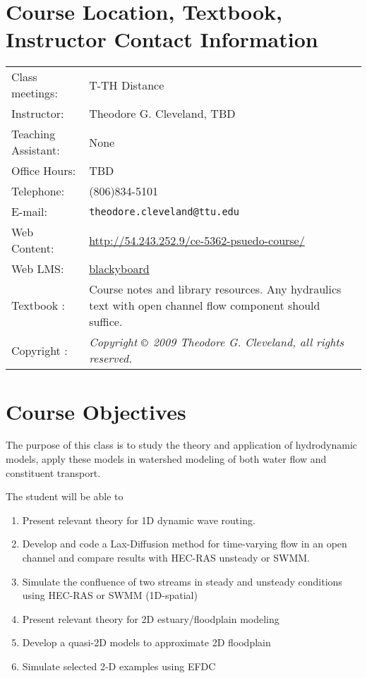 \documentclass[12pt]{article}
\begin{document}
\begin{center}
\end{center}


\section*{\small{Course Location, Textbook, Instructor Contact Information}}
\begin{tabular}{p{1.5in}p{5.0in}}
Class meetings: & T-TH Distance  \\
Instructor: & Theodore G. Cleveland, TBD \\
Teaching Assistant: & None \\
Office Hours: & TBD \\
Telephone: & (806)834-5101 \\
E-mail: & \texttt{theodore.cleveland@ttu.edu}\\
Web Content: & \url{http://54.243.252.9/ce-5362-psuedo-course/}\\
Web LMS: & \url{blackyboard} \\
Textbook : & Course notes and library resources.  Any hydraulics text with open channel flow component should suffice.\\
Copyright : & \textsl{Copyright $\copyright$ 2009 Theodore G. Cleveland, all rights reserved.} \\
\end{tabular}

\section*{\small{Course Objectives}}
The purpose of this class is to study the theory and application of hydrodynamic models, apply these models in watershed modeling of both water flow and constituent transport.

The student will be able to 
\begin{enumerate}
\item Present relevant theory for 1D dynamic wave routing. 
\item Develop and code a Lax-Diffusion method for time-varying flow in an open channel and compare results with HEC-RAS unsteady or SWMM. 
\item Simulate the confluence of two streams in steady and unsteady conditions using HEC-RAS or SWMM (1D-spatial)
\item Present  relevant theory for 2D estuary/floodplain modeling 
\item Develop a quasi-2D models to approximate 2D floodplain 
\item Simulate selected 2-D examples using EFDC 	
\end{enumerate}
\end{document}
